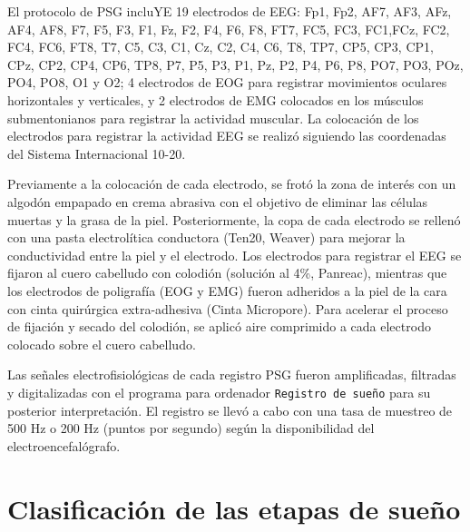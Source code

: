 El protocolo de PSG incluYE 19 electrodos de EEG: 
Fp1, Fp2, AF7, AF3, AFz, AF4, AF8, F7, F5, F3, F1, Fz, F2, F4, F6, F8, FT7, 
FC5, FC3, FC1,FCz, FC2, FC4, FC6, FT8, T7, C5, C3, C1, Cz, C2, C4, C6, T8, TP7, CP5, CP3, CP1,
CPz, CP2, CP4, CP6, TP8, P7, P5, P3, P1, Pz, P2, P4, P6, P8, PO7, PO3, POz, PO4, PO8, O1 y O2; 
4 electrodos de EOG para registrar movimientos oculares horizontales y verticales, 
y 2 electrodos de EMG colocados en los m\'usculos submentonianos para registrar la actividad 
muscular. 
La colocaci\'on de los electrodos para registrar la actividad EEG se realiz\'o siguiendo las 
coordenadas del Sistema Internacional 10-20\cite{Coleman87}.


Previamente a la colocaci\'on de cada electrodo, se frot\'o la zona de inter\'es con un algod\'on 
empapado en crema abrasiva con el objetivo de eliminar las c\'elulas muertas y la grasa de la piel.
Posteriormente, la copa de cada electrodo se rellen\'o con una pasta electrol\'itica 
conductora (Ten20\texttrademark, Weaver) para mejorar la conductividad  entre la piel y el 
electrodo. Los electrodos para registrar el EEG se fijaron al cuero cabelludo con colodi\'on 
(solución al 4\%, Panreac), mientras que los electrodos de poligraf\'ia (EOG y EMG) fueron 
adheridos a la piel de la cara con cinta quir\'urgica extra-adhesiva (Cinta 
Micropore\texttrademark). Para acelerar el proceso de fijaci\'on y secado del colodi\'on, se 
aplic\'o aire comprimido a cada electrodo colocado sobre el cuero cabelludo.


Las se\~nales electrofisiol\'ogicas de cada registro PSG fueron amplificadas, filtradas y 
digitalizadas con el programa para ordenador \texttt{Registro de sue\~no} 
para su posterior interpretaci\'on. 
El registro se llev\'o a cabo con una tasa de muestreo de 500 Hz o 200 Hz (puntos por segundo)
seg\'un la disponibilidad del electroencefal\'ografo.


\section{Clasificaci\'on de las etapas de sue\~no}

